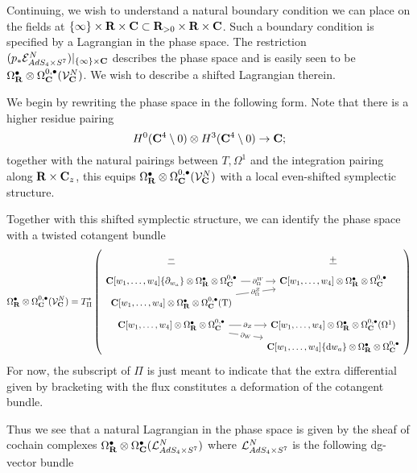\documentclass[../main.tex]{subfiles}
\begin{document}
\parsec{}
Continuing, we wish to understand a natural boundary condition we can place on the fields at $\{\infty\} \times\mathbf{R}\times \mathbf{C}\subset \mathbf{R}_{>0} \times \mathbf{R}\times \mathbf{C}$. Such a boundary condition is specified by a Lagrangian in the phase space. The restriction $(p_* \mathcal{E}^N_{AdS_4\times S^7})|_{\{\infty\}\times \mathbf{C}}$ describes the phase space and is easily seen to be $\Omega^\bullet_{\mathbf{R}}\otimes \Omega^{0,\bullet}_{\mathbf{C}} (\mathcal{V}^N_{\mathbf{C}})$. We wish to describe a shifted Lagrangian therein.

We begin by rewriting the phase space in the following form. Note that there is a higher residue pairing 
\[H^0(\mathbf{C}^4\setminus 0) \otimes H^3(\mathbf{C}^4\setminus 0) \to \mathbf{C};\]
together with the natural pairings between $T, \Omega^1$ and the integration pairing along $\mathbf{R}\times \mathbf{C}_z$, this equips $\Omega^\bullet_{\mathbf{R}}\otimes \Omega^{0,\bullet}_{\mathbf{C}} (\mathcal{V}^N_{\mathbf{C}})$ with a local even-shifted symplectic structure.

Together with this shifted symplectic structure, we can identify the phase space with a twisted cotangent bundle
\[
 \Omega^\bullet_\R\otimes \Omega^{0,\bullet}_\C (\mc V^N_{\C}) = T^* _{\Pi} \left (\begin{tikzcd}[row sep = 1 ex]
 \ul{-} & \ul{+} \\ 
\C[w_1,\ldots, w_4] \{\partial_{w_a}\} \otimes \Omega^\bullet_\R \otimes \Omega^{0,\bullet}_\C\ar[r, "\del^W_\Omega" description] & \C[w_1,\ldots, w_4] \otimes \Omega^\bullet_\R \otimes \Omega^{0,\bullet}_\C \\
\C[w_1,\ldots, w_4] \otimes \Omega^\bullet_\R \otimes \Omega^{0,\bullet}_\C(\T)\ar[ur, "\del^Z_\Omega" description] \\
\C[w_1,\ldots, w_4] \otimes \Omega^\bullet_\R \otimes \Omega^{0,\bullet}_\C\ar[r, "\del_Z" description]\ar[dr, "\del_W" description] & \C[w_1,\ldots, w_4] \otimes \Omega^\bullet_\R \otimes \Omega^{0,\bullet}_\C(\Omega^1)\\ & \C[w_1,\ldots, w_4] \{\d w_a\} \otimes \Omega^\bullet_\R \otimes \Omega^{0,\bullet}_\C   \end{tikzcd} \right) 
\]
For now, the subscript of $\Pi$ is just meant to indicate that the extra differential given by bracketing with the flux constitutes a deformation of the cotangent bundle. 

Thus we see that a natural Lagrangian in the phase space is given by the sheaf of cochain complexes $\Omega^\bullet_{\mathbf{R}}\otimes\Omega^\bullet_{\mathbf{C}} (\mathcal{L}^N_{AdS_4\times S^7})$ where $\mathcal{L}^N_{AdS_4\times S^7}$ is the following dg-vector bundle 
 
\end{document}
